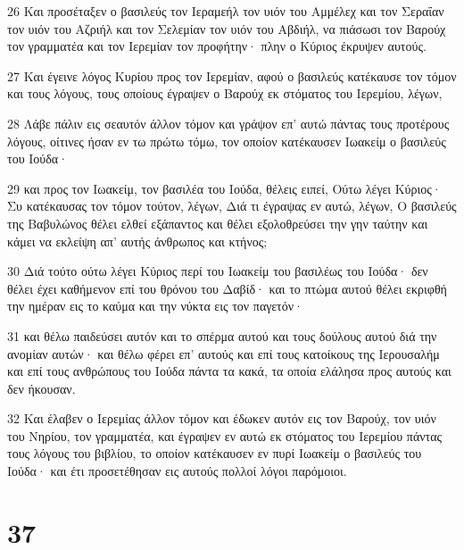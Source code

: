 \par 26 Και προσέταξεν ο βασιλεύς τον Ιεραμεήλ τον υιόν του Αμμέλεχ και τον Σεραΐαν τον υιόν του Αζριήλ και τον Σελεμίαν τον υιόν του Αβδιήλ, να πιάσωσι τον Βαρούχ τον γραμματέα και τον Ιερεμίαν τον προφήτην· πλην ο Κύριος έκρυψεν αυτούς.
\par 27 Και έγεινε λόγος Κυρίου προς τον Ιερεμίαν, αφού ο βασιλεύς κατέκαυσε τον τόμον και τους λόγους, τους οποίους έγραψεν ο Βαρούχ εκ στόματος του Ιερεμίου, λέγων,
\par 28 Λάβε πάλιν εις σεαυτόν άλλον τόμον και γράψον επ' αυτώ πάντας τους προτέρους λόγους, οίτινες ήσαν εν τω πρώτω τόμω, τον οποίον κατέκαυσεν Ιωακείμ ο βασιλεύς του Ιούδα·
\par 29 και προς τον Ιωακείμ, τον βασιλέα του Ιούδα, θέλεις ειπεί, Ούτω λέγει Κύριος· Συ κατέκαυσας τον τόμον τούτον, λέγων, Διά τι έγραψας εν αυτώ, λέγων, Ο βασιλεύς της Βαβυλώνος θέλει ελθεί εξάπαντος και θέλει εξολοθρεύσει την γην ταύτην και κάμει να εκλείψη απ' αυτής άνθρωπος και κτήνος;
\par 30 Διά τούτο ούτω λέγει Κύριος περί του Ιωακείμ του βασιλέως του Ιούδα· δεν θέλει έχει καθήμενον επί του θρόνου του Δαβίδ· και το πτώμα αυτού θέλει εκριφθή την ημέραν εις το καύμα και την νύκτα εις τον παγετόν·
\par 31 και θέλω παιδεύσει αυτόν και το σπέρμα αυτού και τους δούλους αυτού διά την ανομίαν αυτών· και θέλω φέρει επ' αυτούς και επί τους κατοίκους της Ιερουσαλήμ και επί τους ανθρώπους του Ιούδα πάντα τα κακά, τα οποία ελάλησα προς αυτούς και δεν ήκουσαν.
\par 32 Και έλαβεν ο Ιερεμίας άλλον τόμον και έδωκεν αυτόν εις τον Βαρούχ, τον υιόν του Νηρίου, τον γραμματέα, και έγραψεν εν αυτώ εκ στόματος του Ιερεμίου πάντας τους λόγους του βιβλίου, το οποίον κατέκαυσεν εν πυρί Ιωακείμ ο βασιλεύς του Ιούδα· και έτι προσετέθησαν εις αυτούς πολλοί λόγοι παρόμοιοι.

\chapter{37}

